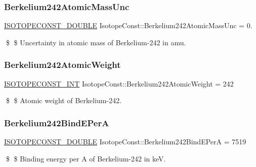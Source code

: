 \subsubsection{\texorpdfstring{Berkelium242\+Atomic\+Mass\+Unc}{Berkelium242AtomicMassUnc}}
{\footnotesize\ttfamily \mbox{\hyperlink{group___isotope_const-_macros_ga8f45a7272ce02c0b4c65c44636ed719a}{I\+S\+O\+T\+O\+P\+E\+C\+O\+N\+S\+T\+\_\+\+D\+O\+U\+B\+LE}} Isotope\+Const\+::\+Berkelium242\+Atomic\+Mass\+Unc = 0.}

\$ \$ Uncertainty in atomic mass of Berkelium-\/242 in amu. \mbox{\label{group___isotope_const-_berkelium-_bk242_ga280828555e5edc0ee7bbd07a2e1ddcde}} 
\subsubsection{\texorpdfstring{Berkelium242\+Atomic\+Weight}{Berkelium242AtomicWeight}}
{\footnotesize\ttfamily \mbox{\hyperlink{group___isotope_const-_macros_ga5f18360b3e99483a35c32d789e62621c}{I\+S\+O\+T\+O\+P\+E\+C\+O\+N\+S\+T\+\_\+\+I\+NT}} Isotope\+Const\+::\+Berkelium242\+Atomic\+Weight = 242}

\$ \$ Atomic weight of Berkelium-\/242. \mbox{\label{group___isotope_const-_berkelium-_bk242_ga13f1d6deff51e8fbcb3d1d1c6607e80e}} 
\subsubsection{\texorpdfstring{Berkelium242\+Bind\+E\+PerA}{Berkelium242BindEPerA}}
{\footnotesize\ttfamily \mbox{\hyperlink{group___isotope_const-_macros_ga8f45a7272ce02c0b4c65c44636ed719a}{I\+S\+O\+T\+O\+P\+E\+C\+O\+N\+S\+T\+\_\+\+D\+O\+U\+B\+LE}} Isotope\+Const\+::\+Berkelium242\+Bind\+E\+PerA = 7519}

\$ \$ Binding energy per A of Berkelium-\/242 in keV. \mbox{\label{group___isotope_const-_berkelium-_bk242_ga6dfaf6d6745a393ad47307f0c9558272}} 
